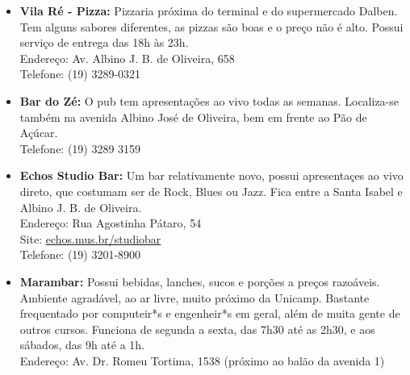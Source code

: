 \begin{itemize}
    \item   \textbf{Vila Ré - Pizza:} Pizzaria próxima do terminal e do
        supermercado Dalben. Tem alguns sabores diferentes, as pizzas são boas e
        o preço não é alto. Possui serviço de entrega das 18h às 23h.
        \\Endereço: Av. Albino J. B. de Oliveira, 658
        \\Telefone: (19) 3289-0321

    \item   \textbf{Bar do Zé:} O pub tem apresentações ao vivo todas as
        semanas.  Localiza-se também na avenida Albino José de Oliveira, bem em
        frente ao Pão de Açúcar.
        \\Telefone: (19) 3289 3159

    \item   \textbf{Echos Studio Bar:} Um bar relativamente novo, possui
        apresentaçes ao vivo direto, que costumam ser de Rock, Blues ou Jazz.
        Fica entre a Santa Isabel e Albino J. B. de Oliveira.
        \\Endereço: Rua Agostinha Pátaro, 54
        \\Site: \url{echos.mus.br/studiobar}
        \\Telefone: (19) 3201-8900

    \item   \textbf{Marambar:} Possui bebidas, lanches, sucos e porções a preços
        razoáveis. Ambiente agradável, ao ar livre, muito próximo da Unicamp.
        Bastante frequentado por computeir*s e engenheir*s em geral, além de
        muita gente de outros cursos. Funciona de segunda a sexta, das 7h30 até
        as 2h30, e aos sábados, das 9h até a 1h.
        \\Endereço: Av. Dr. Romeu Tortima, 1538 (próximo ao balão da avenida 1)

\end{itemize}
